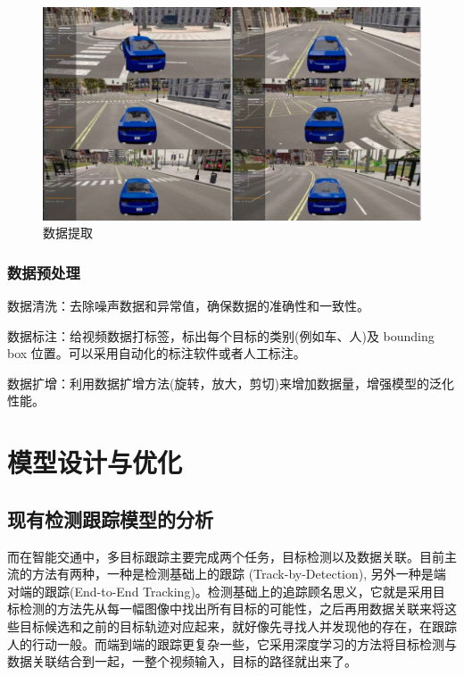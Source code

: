 \begin{figure}[htbp] %
	\centering
	\includegraphics[width=1\textwidth]{p35} %
	\caption{数据提取} %
	\label{fig:p35} %
\end{figure}



\subsubsection{数据预处理}

数据清洗：去除噪声数据和异常值，确保数据的准确性和一致性。

数据标注：给视频数据打标签，标出每个目标的类别(例如车、人)及 bounding box 位置。可以采用自动化的标注软件或者人工标注。

数据扩增：利用数据扩增方法(旋转，放大，剪切)来增加数据量，增强模型的泛化性能。

\section{模型设计与优化}



\subsection{现有检测跟踪模型的分析}


而在智能交通中，多目标跟踪主要完成两个任务，目标检测以及数据关联。目前主流的方法有两种，一种是检测基础上的跟踪 (Track-by-Detection), 另外一种是端对端的跟踪(End-to-End Tracking)。检测基础上的追踪顾名思义，它就是采用目标检测的方法先从每一幅图像中找出所有目标的可能性，之后再用数据关联来将这些目标候选和之前的目标轨迹对应起来，就好像先寻找人并发现他的存在，在跟踪人的行动一般。而端到端的跟踪更复杂一些，它采用深度学习的方法将目标检测与数据关联结合到一起，一整个视频输入，目标的路径就出来了。


